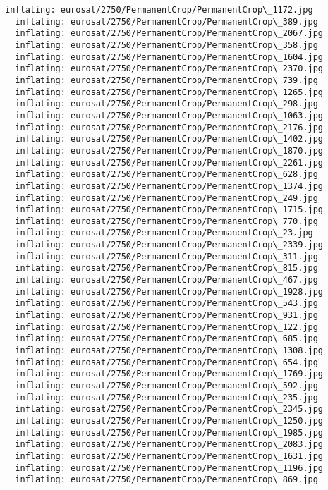 \documentclass[11pt]{article}
\begin{document}
\begin{Verbatim}[commandchars=\\\{\}]
  inflating: eurosat/2750/PermanentCrop/PermanentCrop\_1172.jpg
  inflating: eurosat/2750/PermanentCrop/PermanentCrop\_389.jpg
  inflating: eurosat/2750/PermanentCrop/PermanentCrop\_2067.jpg
  inflating: eurosat/2750/PermanentCrop/PermanentCrop\_358.jpg
  inflating: eurosat/2750/PermanentCrop/PermanentCrop\_1604.jpg
  inflating: eurosat/2750/PermanentCrop/PermanentCrop\_2370.jpg
  inflating: eurosat/2750/PermanentCrop/PermanentCrop\_739.jpg
  inflating: eurosat/2750/PermanentCrop/PermanentCrop\_1265.jpg
  inflating: eurosat/2750/PermanentCrop/PermanentCrop\_298.jpg
  inflating: eurosat/2750/PermanentCrop/PermanentCrop\_1063.jpg
  inflating: eurosat/2750/PermanentCrop/PermanentCrop\_2176.jpg
  inflating: eurosat/2750/PermanentCrop/PermanentCrop\_1402.jpg
  inflating: eurosat/2750/PermanentCrop/PermanentCrop\_1870.jpg
  inflating: eurosat/2750/PermanentCrop/PermanentCrop\_2261.jpg
  inflating: eurosat/2750/PermanentCrop/PermanentCrop\_628.jpg
  inflating: eurosat/2750/PermanentCrop/PermanentCrop\_1374.jpg
  inflating: eurosat/2750/PermanentCrop/PermanentCrop\_249.jpg
  inflating: eurosat/2750/PermanentCrop/PermanentCrop\_1715.jpg
  inflating: eurosat/2750/PermanentCrop/PermanentCrop\_770.jpg
  inflating: eurosat/2750/PermanentCrop/PermanentCrop\_23.jpg
  inflating: eurosat/2750/PermanentCrop/PermanentCrop\_2339.jpg
  inflating: eurosat/2750/PermanentCrop/PermanentCrop\_311.jpg
  inflating: eurosat/2750/PermanentCrop/PermanentCrop\_815.jpg
  inflating: eurosat/2750/PermanentCrop/PermanentCrop\_467.jpg
  inflating: eurosat/2750/PermanentCrop/PermanentCrop\_1928.jpg
  inflating: eurosat/2750/PermanentCrop/PermanentCrop\_543.jpg
  inflating: eurosat/2750/PermanentCrop/PermanentCrop\_931.jpg
  inflating: eurosat/2750/PermanentCrop/PermanentCrop\_122.jpg
  inflating: eurosat/2750/PermanentCrop/PermanentCrop\_685.jpg
  inflating: eurosat/2750/PermanentCrop/PermanentCrop\_1308.jpg
  inflating: eurosat/2750/PermanentCrop/PermanentCrop\_654.jpg
  inflating: eurosat/2750/PermanentCrop/PermanentCrop\_1769.jpg
  inflating: eurosat/2750/PermanentCrop/PermanentCrop\_592.jpg
  inflating: eurosat/2750/PermanentCrop/PermanentCrop\_235.jpg
  inflating: eurosat/2750/PermanentCrop/PermanentCrop\_2345.jpg
  inflating: eurosat/2750/PermanentCrop/PermanentCrop\_1250.jpg
  inflating: eurosat/2750/PermanentCrop/PermanentCrop\_1985.jpg
  inflating: eurosat/2750/PermanentCrop/PermanentCrop\_2083.jpg
  inflating: eurosat/2750/PermanentCrop/PermanentCrop\_1631.jpg
  inflating: eurosat/2750/PermanentCrop/PermanentCrop\_1196.jpg
  inflating: eurosat/2750/PermanentCrop/PermanentCrop\_869.jpg

\end{Verbatim}
\end{document}
